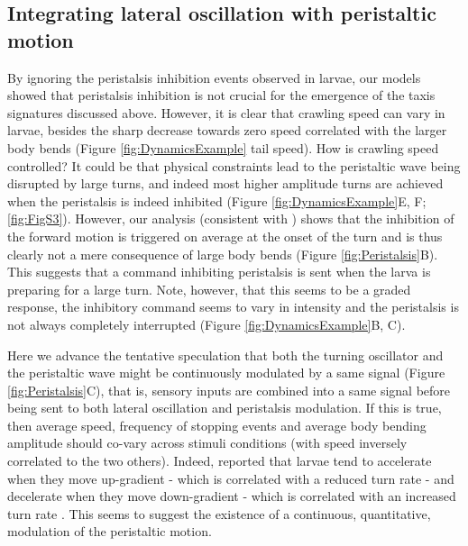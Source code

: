 \documentclass[11pt,a4paper]{article}
\begin{document}
\subsection{Integrating lateral oscillation with peristaltic motion}
By ignoring the peristalsis inhibition events observed in larvae, our models showed that peristalsis inhibition is not crucial for the emergence of the taxis signatures discussed above. However, it is clear that crawling speed can vary in larvae, besides the sharp decrease towards zero speed correlated with the larger body bends (Figure \ref{fig:DynamicsExample} tail speed). How is crawling speed controlled? It could be that physical constraints lead to the peristaltic wave being disrupted by large turns, and indeed most higher amplitude turns are achieved when the peristalsis is indeed inhibited (Figure \ref{fig:DynamicsExample}E, F; \ref{fig:FigS3}). However, our analysis (consistent with \citet{gepner2015computations,hernandez2015reverse}) shows that the inhibition of the forward motion is triggered on average at the onset of the turn and is thus clearly not a mere consequence of large body bends (Figure \ref{fig:Peristalsis}B). This suggests that a  command inhibiting peristalsis is sent when the larva is preparing for a large turn. Note, however, that this seems to be a graded response, the inhibitory command seems to vary in intensity and the peristalsis is not always completely interrupted (Figure \ref{fig:DynamicsExample}B, C).

Here we advance the tentative speculation that both the turning oscillator and the peristaltic wave might be continuously modulated by a same signal (Figure \ref{fig:Peristalsis}C), 
that is, sensory inputs are combined into a same signal before being sent to both lateral oscillation and peristalsis modulation. If this is true, then average speed, frequency of stopping events and average body bending amplitude should co-vary across stimuli conditions (with speed inversely correlated to the two others). Indeed, \cite{gomez2014multilevel} reported that larvae tend to accelerate when they move up-gradient - which is correlated with a reduced turn rate \citep{schleyer2015learning} - and decelerate when they move down-gradient - which is correlated with an increased turn rate \citep{schleyer2015learning}. This seems to suggest the existence of a continuous, quantitative, modulation of the peristaltic motion. 
\end{document}
